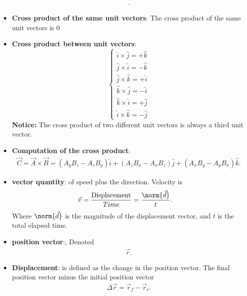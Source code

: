 \documentclass{report}
\begin{document}
\begin{itemize}
\begin{align*}
        .\end{align*}
    \item \textbf{Cross product of the same unit vectors}: The cross product of the same unit vectors is 0
    \item \textbf{Cross product between unit vectors}:
        \begin{equation}
            \begin{cases}
                \hat{i} \times \hat{j} = +\hat{k} \\
                \hat{j} \times \hat{i} = -\hat{k} \\
                \hat{j} \times \hat{k} = +\hat{i} \\
                \hat{k} \times \hat{j} = -\hat{i} \\
                \hat{k} \times \hat{i} = +\hat{j} \\
                \hat{i} \times \hat{k} = -\hat{j}
            \end{cases}
        \end{equation}
        \bigbreak \noindent 
        \textbf{Notice:} The cross product of two different unit vectors is always a third unit vector.
    \item \textbf{Computation of the cross product}:
        \begin{align*}
            \vec{C} = \vec{A} \times \vec{B} = (A_yB_z - A_zB_y)\hat{i} + (A_zB_x - A_xB_z)\hat{j} + (A_xB_y - A_yB_x)\hat{k}
        .\end{align*}
        \pagebreak 
    \item \textbf{vector quantity}: of speed plus the direction. Velocity is 
        \begin{align*}
            \vec{v} &=\frac{\text{Displacement}}{Time} = \frac{\norm{\vec{d}}}{t}
        .\end{align*}
        Where $\norm{\vec{d}}$ is the magnitude of the displacement vector, and $t$ is the total elapsed time.
    \item \textbf{position vector}:, Denoted
        \begin{align*}
            \vec{r}
        .\end{align*}
        \bigbreak \noindent 
    \begin{figure}[ht]
        \centering
        \label{fig:try2}
    \end{figure}
    \item \textbf{Displacement}: is defined as the change in the position vector. The final position vector minus the initial position vector
        \begin{align*}
            \Delta \vec{r} = \vec{r}_{f} - \vec{r}_{i}
        .\end{align*}
    \begin{figure}[ht]
        \centering
        \label{fig:hellowrold}
    \end{figure}






    \end{itemize}
\end{document}
